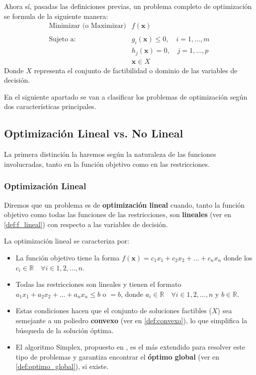 \documentclass[12pt,a4paper]{book}
\begin{document}
Ahora sí, pasadas las definiciones previas, un problema completo de optimización se formula de la siguiente manera:
$$
\begin{array}{ll}
\text{Minimizar (o Maximizar)} & f(\mathbf{x}) \\ \\
\text{Sujeto a:} & g_i(\mathbf{x}) \le 0, \quad i = 1, \ldots, m \\
& h_j(\mathbf{x}) = 0, \quad j = 1, \ldots, p \\
& \mathbf{x} \in X
\end{array}
$$
Donde $X$ representa el conjunto de factibilidad o dominio de las variables de decisión.

En el siguiente apartado se van a clasificar los problemas de optimización según dos características principales.

\subsection{Optimización Lineal vs. No Lineal}

La primera distinción la haremos según la naturaleza de las funciones involucradas, tanto en la función objetivo como en las restricciones.

\subsubsection{Optimización Lineal}
Diremos que un problema es de \textbf{optimización lineal} cuando, tanto la función objetivo como todas las funciones de las restricciones, son \textbf{lineales} (ver en \ref{def:f_lineal}) con respecto a las variables de decisión. 

La optimización lineal se caracteriza por:
\begin{itemize}
    \item La función objetivo tiene la forma $f(\mathbf{x})=c_1x_1+c_2x_2+...+c_nx_n$ donde los $c_i \in \mathbb{R} \quad \forall i \in 1,2,...,n$.
    \item Todas las restricciones son lineales y tienen el formato $a_1x_1+a_2x_2+...+a_nx_n\leq b$ o $=b$, donde $a_i \in \mathbb{R} \quad \forall i \in 1,2,...,n$ y $b\in \mathbb{R}$.
    \item Estas condiciones hacen que el conjunto de soluciones factibles ($X$) sea semejante a un poliedro \textbf{convexo} (ver en \ref{def:convexo}), lo que simplifica la búsqueda de la solución óptima.
    \item El algoritmo Simplex, propuesto en \cite{Dantzig1951}, es el más extendido para resolver este tipo de problemas y garantiza encontrar el \textbf{óptimo global} (ver en \ref{def:optimo_global}), si existe.
\end{itemize}
\end{document}
